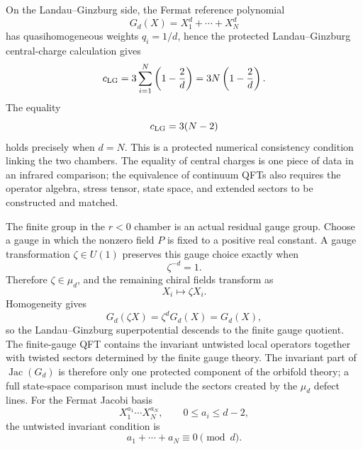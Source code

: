 On the Landau--Ginzburg side, the Fermat reference polynomial
\[
  G_d(X)=X_1^d+\cdots+X_N^d
\]
has quasihomogeneous weights \(q_i=1/d\), hence the protected
Landau--Ginzburg central-charge calculation gives
\begin{equation}
  c_{\rm LG}
  =
  3\sum_{i=1}^N\left(1-\frac{2}{d}\right)
  =
  3N\left(1-\frac{2}{d}\right).
  \label{eq:hypersurface-lg-central-charge}
\end{equation}
The equality
\[
  c_{\rm LG}=3(N-2)
\]
holds precisely when \(d=N\).  This is a protected numerical consistency
condition linking the two chambers.  The equality of central charges is one
piece of data in an infrared comparison; the equivalence of continuum QFTs
also requires the operator algebra, stress tensor, state space, and extended
sectors to be constructed and matched.

The finite group in the \(r<0\) chamber is an actual residual gauge group.
Choose a gauge in which the nonzero field \(P\) is fixed to a positive real
constant.  A gauge transformation \(\zeta\in U(1)\) preserves this gauge
choice exactly when
\[
  \zeta^{-d}=1.
\]
Therefore \(\zeta\in\mu_d\), and the remaining chiral fields transform as
\[
  X_i\longmapsto \zeta X_i .
\]
Homogeneity gives
\[
  G_d(\zeta X)=\zeta^dG_d(X)=G_d(X),
\]
so the Landau--Ginzburg superpotential descends to the finite gauge
quotient.  The finite-gauge QFT contains the invariant untwisted local
operators together with twisted sectors determined by the finite gauge
theory.  The invariant part of \(\operatorname{Jac}(G_d)\) is therefore only
one protected component of the orbifold theory; a full state-space
comparison must include the sectors created by the \(\mu_d\) defect lines.
For the Fermat Jacobi basis
\[
  X_1^{a_1}\cdots X_N^{a_N},
  \qquad 0\leq a_i\leq d-2,
\]
the untwisted invariant condition is
\[
  a_1+\cdots+a_N\equiv0\pmod d .
\]

